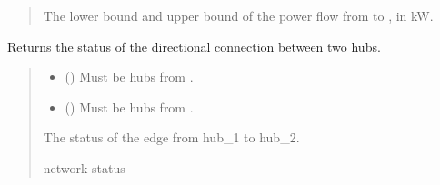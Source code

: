 \documentclass[letterpaper,10pt,english]{sphinxmanual}
\begin{document}
\begin{fulllineitems}
\begin{fulllineitems}
\begin{quote}
\begin{description}
\begin{itemize}
\end{itemize}

\sphinxAtStartPar
The lower bound and upper bound of the power flow from  to , in kW.

\end{description}\end{quote}

\end{fulllineitems}


\begin{fulllineitems}
\label{\detokenize{generated/tamos.network.HREThermalNetwork:tamos.network.HREThermalNetwork.get_connection_status}}
\pysigstartsignatures
{}
\pysigstopsignatures
\sphinxAtStartPar
Returns the status of the directional connection between two hubs.
\begin{quote}\begin{description}
\begin{itemize}
\item {} 
\sphinxAtStartPar
{} ({\hyperref[\detokenize{generated/tamos.Hub:tamos.Hub}]{}}) \textendash{} Must be hubs from .

\item {} 
\sphinxAtStartPar
{} ({\hyperref[\detokenize{generated/tamos.Hub:tamos.Hub}]{}}) \textendash{} Must be hubs from .

\end{itemize}

\sphinxAtStartPar
The status of the edge from hub\_1 to hub\_2.

\sphinxAtStartPar
network status

\end{description}\end{quote}

\end{fulllineitems}


\end{fulllineitems}
\end{document}
